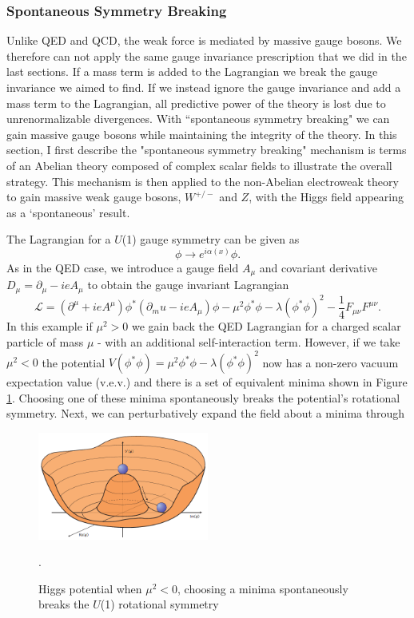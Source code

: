\subsubsection{Spontaneous Symmetry Breaking}
Unlike QED and QCD, the weak force is mediated by massive gauge bosons. We therefore can not apply the same gauge invariance prescription that we did in the last sections. If a mass term is added to the Lagrangian we break the gauge invariance we aimed to find. If we instead ignore the gauge invariance and add a mass term to the Lagrangian, all predictive power of the theory is lost due to unrenormalizable divergences. With ``spontaneous symmetry breaking" we can gain massive gauge bosons while maintaining the integrity of the theory. In this section, I first describe the "spontaneous symmetry breaking" mechanism is terms of an Abelian theory composed of complex scalar fields to illustrate the overall strategy. This mechanism is then applied to the non-Abelian electroweak theory to gain massive weak gauge bosons, $W^{+/-}$ and $Z$, with the Higgs field appearing as a `spontaneous' result.

The Lagrangian for a $U$(1) gauge symmetry can be given as 
\begin{equation}
\phi \rightarrow e^{i\alpha(x)}\phi.
\end{equation}
As in the QED case, we introduce a gauge field $A_\mu$ and covariant derivative $D_\mu = \partial_\mu - ieA_\mu$ to obtain the gauge invariant Lagrangian
\begin{equation}
\mathcal{L} = (\partial^\mu+ieA^\mu)\phi^*(\partial_mu-ieA_\mu)\phi-\mu^2\phi^*\phi-\lambda(\phi^*\phi)^2-\frac{1}{4}F_{\mu\nu}F^{\mu\nu}.
\end{equation}
In this example if $\mu^2>0$ we gain back the QED Lagrangian for a charged scalar particle of mass $\mu$ - with an additional self-interaction term. However, if we take $\mu^2<0$ the potential $V(\phi^*\phi)=\mu^2\phi^*\phi-\lambda(\phi^*\phi)^2$ now has a non-zero vacuum expectation value (v.e.v.) and there is a set of equivalent minima shown in Figure \ref{fig:HiggsPotential}. Choosing one of these minima spontaneously breaks the potential's rotational symmetry. Next, we can perturbatively expand the field about a minima through
\begin{figure}[H]
    \centering
    \includegraphics[width=0.5\textwidth] {Pictures/HiggsPotential.png}\hspace{1cm}
    \caption{Higgs potential when $\mu^2<0$, choosing a minima spontaneously breaks the $U$(1) rotational symmetry \cite{HiggsPotential}}.
    \label{fig:HiggsPotential}
\end{figure}

